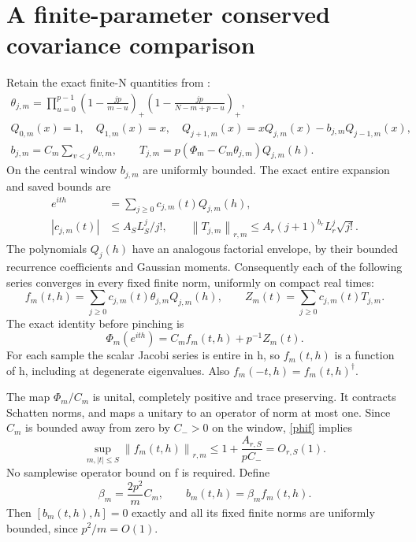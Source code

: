 \documentclass[11pt]{article}
\newcommand{\norm}[1]{\left\lVert#1\right\rVert}
\begin{document}
\newpage
\section{A finite-parameter conserved covariance comparison}
Retain the exact finite-N quantities from \cite{neutral}:
\begin{gather*}
 \theta_{j,m}=\prod_{u=0}^{p-1}
 \left(1-\frac{jp}{m-u}\right)_+
 \left(1-\frac{jp}{N-m+p-u}\right)_+,\\
 Q_{0,m}(x)=1,\quad Q_{1,m}(x)=x,\quad
 Q_{j+1,m}(x)=xQ_{j,m}(x)-b_{j,m}Q_{j-1,m}(x),\\
 b_{j,m}=C_m\sum_{v<j}\theta_{v,m},\qquad
 T_{j,m}=p(\Phi_m-C_m\theta_{j,m})Q_{j,m}(h).
\end{gather*}
On the central window $b_{j,m}$ are uniformly bounded. The
exact entire expansion and saved bounds are
\begin{align}
 e^{ith}&=\sum_{j\ge0}c_{j,m}(t)Q_{j,m}(h),\nonumber\\
 |c_{j,m}(t)|&\le A_S L_S^j/j!,\qquad
 \norm{T_{j,m}}_{r,m}\le A_r(j+1)^{b_r}L_r^j\sqrt{j!}.
 \label{jacobi-bounds}
\end{align}
The polynomials $Q_j(h)$ have an analogous factorial envelope,
by their bounded recurrence coefficients and Gaussian moments.
Consequently each of the following series converges in every
fixed finite norm, uniformly on compact real times:
\begin{equation}\label{fdef}
 f_m(t,h)=\sum_{j\ge0}c_{j,m}(t)\theta_{j,m}Q_{j,m}(h),
 \qquad Z_m(t)=\sum_{j\ge0}c_{j,m}(t)T_{j,m}.
\end{equation}
The exact identity before pinching is
\begin{equation}\label{phif}
 \Phi_m(e^{ith})=C_m f_m(t,h)+p^{-1}Z_m(t).
\end{equation}
For each sample the scalar Jacobi series is entire in h, so
$f_m(t,h)$ is a function of h, including at degenerate eigenvalues.
Also $f_m(-t,h)=f_m(t,h)^\dagger$.

The map $\Phi_m/C_m$ is unital, completely positive and trace
preserving. It contracts Schatten norms, and maps a unitary to
an operator of norm at most one. Since $C_m$ is bounded away
from zero by $C_->0$ on the window, \eqref{phif} implies
\begin{equation}\label{fbnd}
 \sup_{m,|t|\le S}\norm{f_m(t,h)}_{r,m}
 \le 1+\frac{A_{r,S}}{pC_-}=O_{r,S}(1).
\end{equation}
No samplewise operator bound on f is required. Define
\begin{equation}\label{bdef}
 \beta_m=\frac{2p^2}{m}C_m,\qquad
 b_m(t,h)=\beta_m f_m(t,h).
\end{equation}
Then $[b_m(t,h),h]=0$ exactly and all its fixed finite norms
are uniformly bounded, since $p^2/m=O(1)$.
\end{document}
